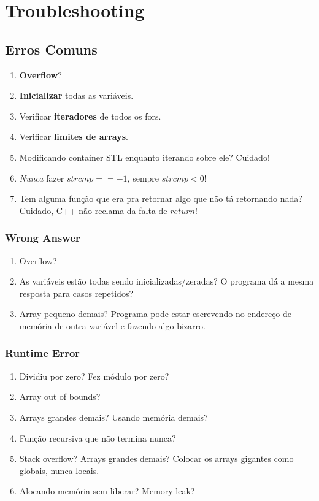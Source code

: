 \documentclass[12pt,a4paper]{article}
\begin{document}
	\section{Troubleshooting}
		\subsection{Erros Comuns}
			\begin{enumerate}
				\item \textbf{Overflow}?
				\item \textbf{Inicializar} todas as variáveis.
				\item Verificar \textbf{iteradores} de todos os fors.
				\item Verificar \textbf{limites de arrays}.
				\item Modificando container STL enquanto iterando sobre ele? Cuidado!
				\item \emph{Nunca} fazer $strcmp == -1$, sempre $strcmp < 0$!
				\item Tem alguma função que era pra retornar algo que não tá retornando nada? Cuidado, C++ não reclama da falta de $return$!
			\end{enumerate}
			\subsubsection{Wrong Answer}
				\begin{enumerate}
					\item Overflow?
					\item As variáveis estão todas sendo inicializadas/zeradas? O programa dá a mesma resposta para casos repetidos?
					\item Array pequeno demais? Programa pode estar escrevendo no endereço de memória de outra variável e fazendo algo bizarro.
				\end{enumerate}
			\subsubsection{Runtime Error}
				\begin{enumerate}
					\item Dividiu por zero? Fez módulo por zero?
					\item Array out of bounds?
					\item Arrays grandes demais? Usando memória demais?
					\item Função recursiva que não termina nunca?
					\item Stack overflow? Arrays grandes demais? Colocar os arrays gigantes como globais, nunca locais.
					\item Alocando memória sem liberar? Memory leak?
				\end{enumerate}
\end{document}
